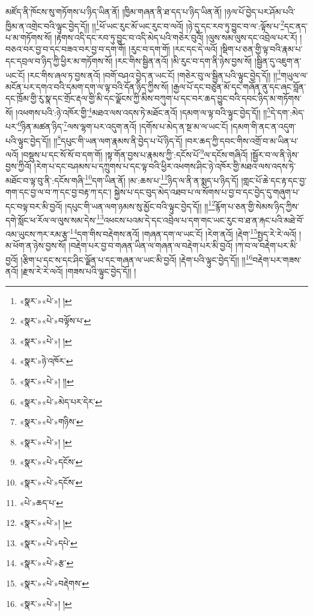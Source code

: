 མཛོད་ནི་ཁོངས་སུ་གཏོགས་པ་ཉིད་ཡིན་ནོ། །ཁྱིམ་གཞན་ནི་ཐ་དད་པ་ཉིད་ཡིན་ནོ། །ཉལ་པོ་བྱེད་པར་ཤོམ་པའི་ཁྱིམ་ན་འགྲེང་བའི་ལྟུང་བྱེད་དོ།། །།\footnote{«སྣར་»«པེ་»། །}ཕོ་ཡང་རུང་མོ་ཡང་རུང་བ་ལའོ། །ཉེ་དུ་དང་རབ་ཏུ་བྱུང་བ་ལ་:ལྟོས་པ་\footnote{«སྣར་»«པེ་»བལྟོས་པ་}དང་ནད་པ་མ་གཏོགས་སོ། །རྟགས་འདི་དང་རབ་ཏུ་བྱུང་བ་འདི་མེད་པའི་གཅེར་བུའོ། །ལུས་སམ་ལུས་དང་འབྲེལ་པར་རོ། །བཅའ་བར་བྱ་བ་དང་བཟའ་བར་བྱ་བ་དག་གོ། །རུང་བ་དག་གོ། །རང་དང་དེ་ལའོ། །སྡིག་པ་ཅན་གྱི་ལྟ་བའི་རྣམ་པ་དང་དབྲལ་བ་ཉིད་ཀྱི་ཕྱིར་མ་གཏོགས་སོ། །རང་གིས་སྦྱིན་ནའོ། །མི་རུང་བ་དག་ནི་ཉེས་བྱས་སོ། །སྦྱིན་དུ་འཇུག་ན་ཡང་ངོ། །རང་གིས་ཞལ་ཏ་བྱས་ནའོ། །བགོ་བཤའ་བྱེད་ན་ཡང་ངོ། །གཅེར་བུ་ལ་སྦྱིན་པའི་ལྟུང་བྱེད་དོ།། །།\footnote{«སྣར་»«པེ་»། །}གཡུལ་ལ་མངོན་པར་དགའ་བའི་དམག་དག་ལ་ལྟ་བའི་དོན་ཉིད་ཀྱིས་སོ། །རྒྱལ་པོ་དང་བཙུན་མོ་དང་གཞོན་ནུ་དང་ཞང་བློན་དང་ཁྲོམ་གྱི་རུ་སྣ་དང་གྲོང་རྡལ་གྱི་མི་དང་ལྗོངས་ཀྱི་མིས་བཀུག་པ་དང་བར་ཆད་བྱུང་བའི་དབང་ཉིད་མ་གཏོགས་སོ། །འཕགས་པའི་:ཉེ་འཁོར་གྱི་\footnote{«སྣར་»ཉེ་འཁོར་}མཐའ་ལས་འདས་ཏེ་མཐོང་ནའོ། །དམག་ལ་ལྟ་བའི་ལྟུང་བྱེད་དོ།། །།\footnote{«སྣར་»«པེ་»། །།}དེ་དག་:མེད་པར་\footnote{«སྣར་»«པེ་»མེད་པར་དེར་}ཉིན་མཚན་ཉིད་\footnote{«སྣར་»«པེ་»གཉིས་}ལས་ལྷག་པར་འདུག་ནའོ། །དགོས་པ་མེད་ན་སྔ་མ་ལ་ཡང་ངོ། །དམག་གི་ནང་ན་འདུག་པའི་ལྟུང་བྱེད་དོ།། །།\footnote{«སྣར་»«པེ་»། །}དཔུང་གི་ཡན་ལག་རྣམས་ནི་བྱེད་པ་པོ་ཉིད་དོ། །བར་ཆད་ཀྱི་དབང་གིས་འགྲོ་བ་མ་ཡིན་པ་ལའོ། །བསྡུས་པ་དང་སོ་སོ་བ་དག་གོ། །སྟ་གོན་བྱས་པ་རྣམས་ཀྱི་:དངོས་པོ་\footnote{«སྣར་»«པེ་»དངོས་}ལ་དངོས་གཞིའོ། །སྦྱོར་བ་ལ་ནི་ཉེས་བྱས་ཀྱིའོ། །རེག་པ་དང་བཤམས་པ་དཀྲུགས་པ་དང་ལྟ་བའི་ཕྱིར་འཕགས་ཤིང་ཉེ་འཁོར་གྱི་མཐའ་ལས་འདས་ཏེ་མཐོང་བ་ལྟ་བུ་ནི་:དངོས་གཞི་\footnote{«སྣར་»«པེ་»དངོས་}དག་ཡིན་ནོ། །མ་:ཆས་པ་\footnote{«པེ་»ཆད་པ་}ཉིད་ལ་ནི་ན་སྨད་པ་ཉིད་དོ། །གླང་པོ་ཆེ་དང་རྟ་དང་བྱ་གག་དང་བྱ་ལ་བ་ཀ་དང་བྱ་བརྟ་ཀ་དང་། སྐྱེས་པ་དང་བུད་མེད་འཐབ་པ་ལ་སོགས་པ་བྱ་བ་དང་བྱེད་དུ་གཞུག་པ་དང་བལྟ་བར་མི་བྱའོ། །དཔུང་གི་ཡན་ལག་ཉམས་སུ་མྱོང་བའི་ལྟུང་བྱེད་དོ།། །།\footnote{«སྣར་»«པེ་»། །}རྙོག་པ་ཅན་གྱི་སེམས་ཉིད་ཀྱིས་དགེ་སློང་ཕ་རོལ་ལ་ལུས་སམ་དེས་\footnote{«སྣར་»«པེ་»དཔེ་}འཕངས་པའམ་དེ་དང་འབྲེལ་པ་དག་གང་ཡང་རུང་བ་ཐ་ན་རྐང་པའི་མཐེ་བོ་འམ་ཡུངས་ཀར་རམ་རྩྭ་\footnote{«སྣར་»«པེ་»རྩ་}དག་གིས་བརྡེགས་ནའོ། །གཞན་དག་ལ་ཡང་ངོ། །རེག་ནའོ། །རྡེག་\footnote{«སྣར་»«པེ་»བརྡེགས་}སྤྱད་རེ་རེ་ལའོ། །མ་ཕོག་ན་ཉེས་བྱས་སོ། །བརྡེག་པར་བྱ་བ་གཞན་ཡིན་ལ་གཞན་ལ་བརྡེག་པར་མི་བྱའོ། །ཀ་བ་ལ་བརྡེག་པར་མི་བྱའོ། །རྩིག་པ་དང་ས་དང་ཤིང་ལྗོན་པ་དང་གཞན་ལ་ཡང་མི་བྱའོ། །རྡེག་པའི་ལྟུང་བྱེད་དོ།། །།\footnote{«སྣར་»«པེ་»། །}བརྡེག་པར་གཟས་ནའོ། །རྫས་རེ་རེ་ལའོ། །གཟས་པའི་ལྟུང་བྱེད་དོ།། །
